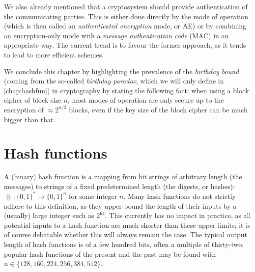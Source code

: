 We also already mentioned that a cryptosystem should provide authentication of the communicating parties. This is either done directly by the mode of operation (which is then
called an \emph{authenticated encryption} mode, or AE) or by combining an encryption-only mode with a \emph{message authentication code} (MAC) in an appropriate way. The current
trend is to favour the former approach, as it tends to lead to more efficient schemes.

We conclude this chapter by highlighting the prevalence of the \emph{birthday bound} (coming from the so-called \emph{birthday paradox}, which we will
only define in \autoref{chap:hashfun}) in cryptography by stating the following fact: when using a block cipher of block size $n$, most modes of operation are only
secure up to the encryption of $\approx 2^{n/2}$ blocks, even if the key size of the block cipher can be much bigger than that.







\section{Hash functions}

A (binary) hash function is a mapping from bit strings of arbitrary length (the messages) to strings of a fixed predetermined length (the digests, or hashes):
$\hash : \{0,1\}^* \rightarrow \{0,1\}^n$ for some integer $n$.
Many hash functions do not strictly adhere to this definition, as they upper-bound the length of their inputs by a (usually) large integer such as $2^{64}$. This currently has
no impact in practice, as all potential inputs to a hash function are much shorter than these upper limits; it is of course debatable whether this will always remain the case. 
The typical output length of hash functions is of a few hundred bits, often a multiple of thirty-two; popular hash functions of the present and the past may be found with
$n \in \{128, 160, 224, 256, 384, 512\}$.

